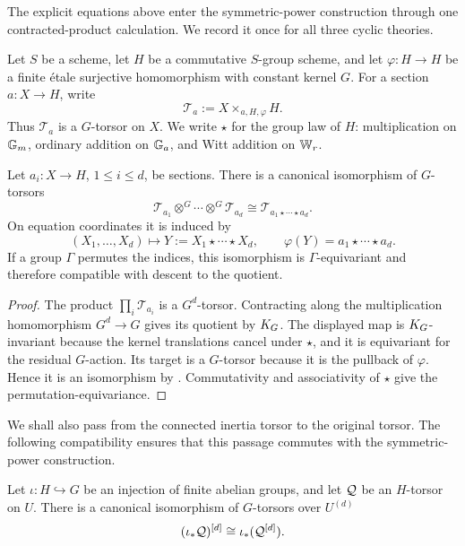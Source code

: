 The explicit equations above enter the symmetric-power construction through
one contracted-product calculation. We record it once for all three cyclic
theories.

Let $S$ be a scheme, let $H$ be a commutative $S$-group scheme, and let
$\varphi:H\to H$ be a finite \'etale surjective homomorphism with constant
kernel $G$. For a section $a:X\to H$, write
\[
    \mathcal T_a:=X\times_{a,H,\varphi}H.
\]
Thus $\mathcal T_a$ is a $G$-torsor on $X$. We write $\star$ for the group
law of $H$: multiplication on $\mathbb{G}_m$, ordinary addition on $\mathbb{G}_a$, and
Witt addition on $\mathbb{W}_r$.

\begin{prop}
\label{prop:parallel_cyclic_product_torsor}
Let $a_i:X\to H$, $1\leq i\leq d$, be sections. There is a canonical
isomorphism of $G$-torsors
\[
    \mathcal T_{a_1}\otimes^G\cdots\otimes^G\mathcal T_{a_d}
       \cong \mathcal T_{a_1\star\cdots\star a_d}.
\]
On equation coordinates it is induced by
\[
    (X_1,\dots,X_d)\longmapsto
    Y:=X_1\star\cdots\star X_d,
    \qquad
    \varphi(Y)=a_1\star\cdots\star a_d.
\]
If a group $\Gamma$ permutes the indices, this isomorphism is
$\Gamma$-equivariant and therefore compatible with descent to the quotient.
\end{prop}

\begin{proof}
The product $\prod_i\mathcal T_{a_i}$ is a $G^d$-torsor. Contracting along
the multiplication homomorphism $G^d\to G$ gives its quotient by $K_{G}$.
The displayed map is $K_{G}$-invariant because the kernel translations cancel
under $\star$, and it is equivariant for the residual $G$-action. Its target
is a $G$-torsor because it is the pullback of $\varphi$. Hence it is an
isomorphism by . Commutativity and
associativity of $\star$ give the permutation-equivariance.
\end{proof}

We shall also pass from the connected inertia torsor to the original torsor.
The following compatibility ensures that this passage commutes with the
symmetric-power construction.

\begin{lemma}
\label{lemma:symmetric_power_induced_torsor}
Let $\iota:H\hookrightarrow G$ be an injection of finite abelian groups, and
let $\mathcal{Q}$ be an $H$-torsor on $U$. There is a canonical isomorphism of
$G$-torsors over $U^{(d)}$
\[
    (\iota_*\mathcal{Q})^{[d]}\cong\iota_*(\mathcal{Q}^{[d]}).
\]
\end{lemma}

